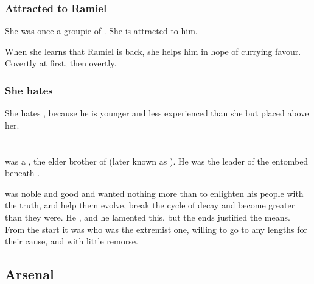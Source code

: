 \subsubsection{Attracted to Ramiel}
She was once a groupie of . She is attracted to him. 

When she learns that Ramiel is back, she helps him in hope of currying favour. Covertly at first, then overtly.





\subsubsection{She hates \Teshrial}
She hates \Teshrial, because he is younger and less experienced than she but placed above her.















\section{\Damiarch}
\index{\Damiarch}
\Damiarch{} was a \resphan, the elder brother of \Gevural{} (later known as \Azraid). 
He was the leader of the  entombed beneath \Merkyrah. 

\Damiarch{} was noble and good and wanted nothing more than to enlighten his people with the truth, and help them evolve, break the cycle of decay and become greater than they were. 
He , and he lamented this, but the ends justified the means. 
From the start it was \Gevural{} who was the extremist one, willing to go to any lengths for their cause, and with little remorse. 









\subsection{Arsenal}





